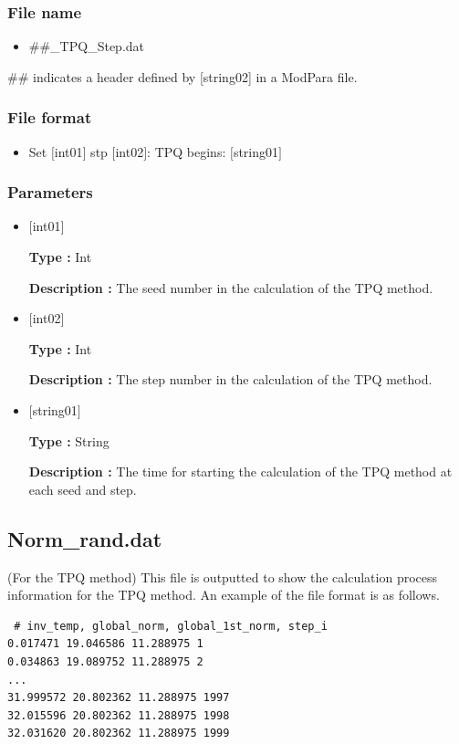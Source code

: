\subsubsection{File name}
 \begin{itemize}
   \item  \#\#\_TPQ\_Step.dat
  \end{itemize}
  \#\# indicates a header defined by [string02] in a ModPara file.

\subsubsection{File format}
 \begin{itemize}
   \item Set $[$int01$]$ stp $[$int02$]$: TPQ begins: $[$string01$]$
  \end{itemize}
\subsubsection{Parameters}
 \begin{itemize}

  \item  $[$int01$]$
  
 {\bf Type :} Int

{\bf Description :} The seed number in the calculation of the TPQ method.
 
  \item  $[$int02$]$
  
 {\bf Type :} Int

{\bf Description :} The step number in the calculation of the TPQ method.

  \item  $[$string01$]$
  
 {\bf Type :} String

{\bf Description :} The time for starting the calculation of the TPQ method at each seed and step.

 \end{itemize}


\newpage
\subsection{Norm\_rand.dat}
\label{Subsec:normrand}
(For the TPQ method) This file is outputted to show the calculation process information for the TPQ method.
An example of the file format is as follows.\\
\begin{minipage}{12.5cm}
\begin{screen}
\begin{verbatim}
 # inv_temp, global_norm, global_1st_norm, step_i 
0.017471 19.046586 11.288975 1
0.034863 19.089752 11.288975 2
...
31.999572 20.802362 11.288975 1997
32.015596 20.802362 11.288975 1998
32.031620 20.802362 11.288975 1999
\end{verbatim}
\end{screen}
\end{minipage}

